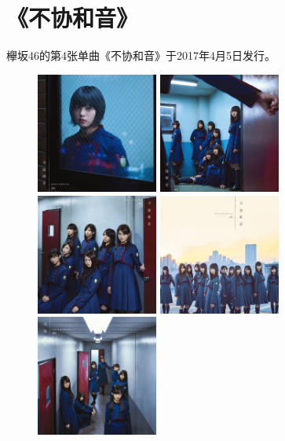 ﻿
\chapter{《不协和音》}

欅坂46的第4张单曲《不协和音》于2017年4月5日发行。
\\

\begin{figure}[htp]
  \centering
  {\includegraphics[width=40mm]{images/single-4/4-1.jpg}}
  {\includegraphics[width=40mm]{images/single-4/4-2.jpg}}
  \\
  {\includegraphics[width=40mm]{images/single-4/4-3.jpg}}
  {\includegraphics[width=40mm]{images/single-4/4-4.jpg}}
  {\includegraphics[width=40mm]{images/single-4/4-5.jpg}}
\end{figure}


